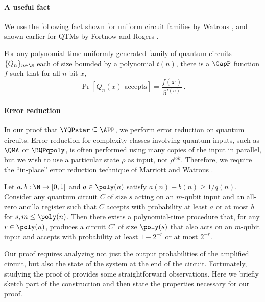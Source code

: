 \paragraph{A useful fact}
We use the following fact shown for uniform circuit families by Watrous
\cite[Section~IV.5]{watrous2008quantum}, and shown earlier for QTMs by Fortnow and
Rogers \cite{fortnow1999complexity}.

\begin{lemma}\label{lem:quantumGapP}
	For any polynomial-time uniformly generated family of quantum circuits
	$\{Q_n\}_{n\in \N}$ each of
	size bounded by a polynomial $t(n)$,
	there is a $\GapP$ function $f$ such that for all $n$-bit $x$,
	\[
	\Pr\left[Q_n(x)\text{ accepts}\right] = \frac{f(x)}{5^{t(n)}} \, .
	\]
\end{lemma}

\paragraph{Error reduction}

In our proof that $\YQPstar\subseteq \APP$, we perform error reduction on quantum circuits.
Error reduction for complexity classes involving quantum inputs, such as $\QMA$ or $\BQPqpoly$,
is often performed using many copies of the input in parallel,
but we wish to use a particular state $\rho$ as input, not $\rho^{\otimes k}$.
Therefore,
we require the ``in-place'' error reduction technique of
Marriott and Watrous \cite{marriott2005quantum}.

\begin{theorem}\label{thm:MW}
	Let $a,b:\N\rightarrow [0,1]$ and $q\in \poly(n)$ satisfy $a(n)-b(n)\geq 1/q(n)$.
	Consider any quantum circuit $C$
	of size $s$
	acting on an $m$-qubit input and an all-zero ancilla register
%
	such that $C$ accepts with probability at least $a$ or at most $b$ %
	for $s,m\leq\poly(n)$.
	Then there exists a polynomial-time procedure
	that, for any $r\in\poly(n)$,
	produces a circuit $C'$
	of size $\poly(s)$ that also
	acts on an $m$-qubit input
%
	and accepts with probability at least %
	$1-2^{-r}$ or at most $2^{-r}$.
%
\end{theorem}

Our proof requires analyzing not just the output probabilities of the amplified circuit,
but also the state of the system at the end of the circuit.
Fortunately, studying the proof of \cite[Theorem 3.3]{marriott2005quantum} provides some straightforward observations.
Here we briefly sketch part of the construction and then state the properties necessary for our proof.

